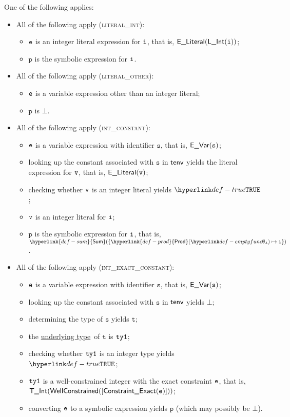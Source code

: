 \documentclass{book}
\newcommand\ProseOrTypeError[0]{\ProseTerminateAs{\TypeErrorConfig}}
\newcommand\Prod[0]{\hyperlink{def-prod}{\textsf{Prod}}}
\newcommand\Sum[0]{\hyperlink{def-sum}{\textsf{Sum}}}
\newcommand\underlyingtype[0]{\hyperlink{def-underlyingtype}{underlying type}}
\newcommand\vp[0]{\texttt{p}}
\newcommand\vt[0]{\texttt{t}}
\newcommand\vs[0]{\texttt{s}}
\begin{document}
One of the following applies:
\begin{itemize}
  \item All of the following apply (\textsc{literal\_int}):
  \begin{itemize}
    \item $\texttt{e}$ is an integer literal expression for $\texttt{i}$, that is, $\textsf{E\_Literal}(\textsf{L\_Int}(\texttt{i}))$;
    \item $\vp$ is the symbolic expression for $\texttt{i}$.
  \end{itemize}

  \item All of the following apply (\textsc{literal\_other}):
  \begin{itemize}
    \item $\texttt{e}$ is a variable expression other than an integer literal;
    \item $\vp$ is $\bot$.
  \end{itemize}

  \item All of the following apply (\textsc{int\_constant}):
  \begin{itemize}
    \item $\texttt{e}$ is a variable expression with identifier $\vs$, that is, $\EVar(\vs)$;
    \item looking up the constant associated with $\vs$ in $\textsf{tenv}$ yields the literal expression for $\texttt{v}$, that is, $\textsf{E\_Literal}(\texttt{v})$;
    \item checking whether $\texttt{v}$ is an integer literal yields $\True$\ProseOrTypeError;
    \item $\texttt{v}$ is an integer literal for $\texttt{i}$;
    \item $\vp$ is the symbolic expression for $\texttt{i}$, that is, $\Sum( \{ \Prod(\emptyfunc)\mapsto \vi \} )$.
  \end{itemize}

  \item All of the following apply (\textsc{int\_exact\_constant}):
  \begin{itemize}
    \item $\texttt{e}$ is a variable expression with identifier $\vs$, that is, $\EVar(\vs)$;
    \item looking up the constant associated with $\vs$ in $\textsf{tenv}$ yields $\bot$;
    \item determining the type of $\vs$ yields $\vt$\ProseOrTypeError;
    \item the \underlyingtype\ of $\vt$ is $\texttt{ty1}$\ProseOrTypeError;
    \item checking whether $\texttt{ty1}$ is an integer type yields $\True$\ProseOrTypeError;
    \item $\texttt{ty1}$ is a well-constrained integer with the exact constraint $\texttt{e}$, that is, \\ $\textsf{T\_Int}(\textsf{WellConstrained}([\textsf{Constraint\_Exact}(\texttt{e})]))$;
    \item converting $\texttt{e}$ to a symbolic expression yields $\vp$ (which may possibly be $\bot$).
  \end{itemize}


\end{itemize}
\end{document}

